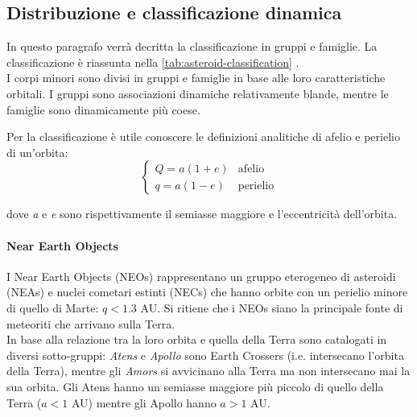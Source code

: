 \documentclass[a4paper,11pt,openright]{book}
\begin{document}
\subsection{Distribuzione e classificazione dinamica}
In questo paragrafo verrà decritta la classificazione in gruppi e famiglie.
La classificazione è riassunta nella \cref{tab:asteroid-classification} .\\
I corpi minori sono divisi in gruppi e famiglie in base alle loro caratteristiche orbitali. 
I gruppi sono associazioni dinamiche relativamente blande, mentre le famiglie sono dinamicamente più coese.

Per la classificazione è utile conoscere le definizioni analitiche di afelio e perielio di un'orbita:
\begin{equation}
    \begin{cases}
        Q=a(1+e) &\text{afelio}\\
        q=a(1-e) &\text{perielio}
    \end{cases}
\end{equation}

dove \textit{a} e \textit{e} sono rispettivamente il semiasse maggiore e l'eccentricità dell'orbita.

\paragraph*{Near Earth Objects}\label{sec:neo}
I Near Earth Objects (NEOs) rappresentano un gruppo eterogeneo di asteroidi (NEAs) e nuclei cometari estinti (NECs) che hanno orbite con un perielio minore di quello di Marte: $q<1.3$ AU. Si ritiene che i NEOs siano la principale fonte di meteoriti che arrivano sulla Terra.\\
In base alla relazione tra la loro orbita e quella della Terra sono catalogati in diversi sotto-gruppi: \textit{Atens} e \textit{Apollo} sono Earth Crossers (i.e. intersecano l’orbita della Terra), mentre gli \textit{Amors} si avvicinano alla Terra ma non intersecano mai la sua orbita. Gli Atens hanno un semiasse maggiore più piccolo di quello della Terra ($a<1$ AU) mentre gli Apollo hanno $a>1$ AU.
\end{document}
